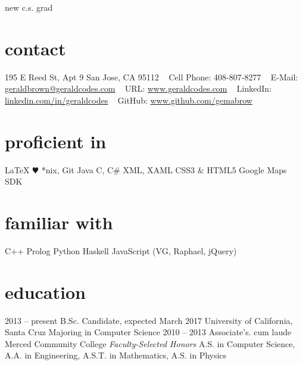 \documentclass[]{./friggeri-cv}
\begin{document}
       {new c.s. grad}

\begin{aside}
  \section{contact}
    \hspace{-3em}195 E Reed St, Apt 9
    San Jose, CA 95112
    ~
    {Cell Phone: 408-807-8277} 
    ~ 
    E-Mail: \href{mailto:geraldbrown@geraldcodes.com}{\hspace{-5em}geraldbrown@geraldcodes.com}
    ~
    URL: \href{http://www.geraldcodes.com}{www.geraldcodes.com}
    ~ 
    LinkedIn: \href{http://linkedin.com/in/geraldcodes}{\hspace{-3em}linkedin.com/in/geraldcodes}
    ~
    GitHub: \href{http://www.github.com/gemabrow}{\hspace{-3em}www.github.com/gemabrow}
  \section{proficient in}
    \LaTeX
   {\color{red} $\varheartsuit$} %
    *nix, Git
    Java
    C, C\#
    XML, XAML
    CSS3 \& HTML5
    Google Maps SDK
 \section{familiar with}
    C++
    Prolog
    Python
    Haskell
    JavaScript
    (VG, Raphael, jQuery)
\end{aside}
\section{education}
\begin{entrylist}
  \entry
    {2013 -- present}
    {B.Sc. {\normalfont Candidate, expected March 2017}}
    {University of California, Santa Cruz}
    {Majoring in Computer Science}
  \entry
    {2010 -- 2013}
    {Associate's. cum laude}
    {Merced Community College}
    {\emph{Faculty-Selected Honors} A.S. in Computer Science,
    \\A.A. in Engineering, A.S.T. in Mathematics, A.S. in Physics}
\end{entrylist}
\end{document}
